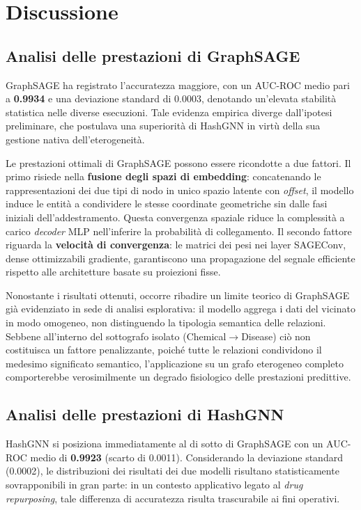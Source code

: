 \section{Discussione}

\subsection{Analisi delle prestazioni di GraphSAGE}

GraphSAGE ha registrato l'accuratezza maggiore, con un AUC-ROC medio pari a \textbf{0.9934} e una deviazione standard di 0.0003, denotando un'elevata stabilità statistica nelle diverse esecuzioni. Tale evidenza empirica diverge dall'ipotesi preliminare, che postulava una superiorità di HashGNN in virtù della sua gestione nativa dell'eterogeneità.

Le prestazioni ottimali di GraphSAGE possono essere ricondotte a due fattori. Il primo risiede nella \textbf{fusione degli spazi di embedding}: concatenando le rappresentazioni dei due tipi di nodo in unico spazio latente con \textit{offset}, il modello induce le entità a condividere le stesse coordinate geometriche sin dalle fasi iniziali dell'addestramento. Questa convergenza spaziale riduce la complessità a carico \textit{decoder} MLP nell'inferire la probabilità di collegamento. Il secondo fattore riguarda la \textbf{velocità di convergenza}: le matrici dei pesi nei layer SAGEConv, dense ottimizzabili gradiente, garantiscono una propagazione del segnale efficiente rispetto alle architetture basate su proiezioni fisse.

Nonostante i risultati ottenuti, occorre ribadire un limite teorico di GraphSAGE già evidenziato in sede di analisi esplorativa: il modello aggrega i dati del vicinato in modo omogeneo, non distinguendo la tipologia semantica delle relazioni. Sebbene all'interno del sottografo isolato (Chemical$\to$Disease) ciò non costituisca un fattore penalizzante, poiché tutte le relazioni condividono il medesimo significato semantico, l'applicazione su un grafo eterogeneo completo comporterebbe verosimilmente un degrado fisiologico delle prestazioni predittive.

\subsection{Analisi delle prestazioni di HashGNN}

HashGNN si posiziona immediatamente al di sotto di GraphSAGE con un AUC-ROC medio di \textbf{0.9923} (scarto di 0.0011). Considerando la deviazione standard (0.0002), le distribuzioni dei risultati dei due modelli risultano statisticamente sovrapponibili in gran parte: in un contesto applicativo legato al \textit{drug repurposing}, tale differenza di accuratezza risulta trascurabile ai fini operativi.

